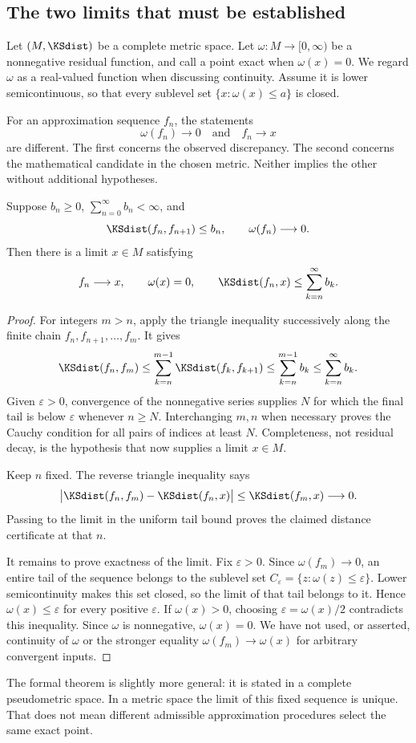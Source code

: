 \subsection{The two limits that must be established}
Let \((M,\KSdist)\) be a complete metric space. Let \(\omega:M\to[0,\infty)\) be a nonnegative residual function, and call a point exact when \(\omega(x)=0\). We regard \(\omega\) as a real-valued function when discussing continuity. Assume it is lower semicontinuous, so that every sublevel set \(\{x:\omega(x)\le a\}\) is closed.

For an approximation sequence \(f_n\), the statements
\[
 \omega(f_n)\longrightarrow0
 \quad\text{and}\quad
 f_n\longrightarrow x
\]
are different. The first concerns the observed discrepancy. The second concerns the mathematical candidate in the chosen metric. Neither implies the other without additional hypotheses.

\begin{KStheorem}\label{KS:KS71}
Suppose \(b_n\ge0\), \(\sum_{n=0}^{\infty}b_n<\infty\), and
\[
 \KSdist(f_n,f_{n+1})\le b_n,\qquad \omega(f_n)\longrightarrow0.
\]
Then there is a limit \(x\in M\) satisfying
\[
 f_n\longrightarrow x,\qquad\omega(x)=0,\qquad
 \KSdist(f_n,x)\le\sum_{k=n}^{\infty}b_k.
\]
\end{KStheorem}
\begin{proof}
For integers \(m>n\), apply the triangle inequality successively along the finite chain \(f_n,f_{n+1},\ldots,f_m\). It gives
\[
 \KSdist(f_n,f_m)\le\sum_{k=n}^{m-1}\KSdist(f_k,f_{k+1})
 \le\sum_{k=n}^{m-1}b_k\le\sum_{k=n}^{\infty}b_k.
\]
Given \(\varepsilon>0\), convergence of the nonnegative series supplies \(N\) for which the final tail is below \(\varepsilon\) whenever \(n\ge N\). Interchanging \(m,n\) when necessary proves the Cauchy condition for all pairs of indices at least \(N\). Completeness, not residual decay, is the hypothesis that now supplies a limit \(x\in M\).

Keep \(n\) fixed. The reverse triangle inequality says
\[
 \bigl|\KSdist(f_n,f_m)-\KSdist(f_n,x)\bigr|\le\KSdist(f_m,x)\longrightarrow0.
\]
Passing to the limit in the uniform tail bound proves the claimed distance certificate at that \(n\).

It remains to prove exactness of the limit. Fix \(\varepsilon>0\). Since \(\omega(f_m)\to0\), an entire tail of the sequence belongs to the sublevel set \(C_\varepsilon=\{z:\omega(z)\le\varepsilon\}\). Lower semicontinuity makes this set closed, so the limit of that tail belongs to it. Hence \(\omega(x)\le\varepsilon\) for every positive \(\varepsilon\). If \(\omega(x)>0\), choosing \(\varepsilon=\omega(x)/2\) contradicts this inequality. Since \(\omega\) is nonnegative, \(\omega(x)=0\). We have not used, or asserted, continuity of \(\omega\) or the stronger equality \(\omega(f_m)\to\omega(x)\) for arbitrary convergent inputs.
\end{proof}
The formal theorem is slightly more general: it is stated in a complete pseudometric space. In a metric space the limit of this fixed sequence is unique. That does not mean different admissible approximation procedures select the same exact point.

